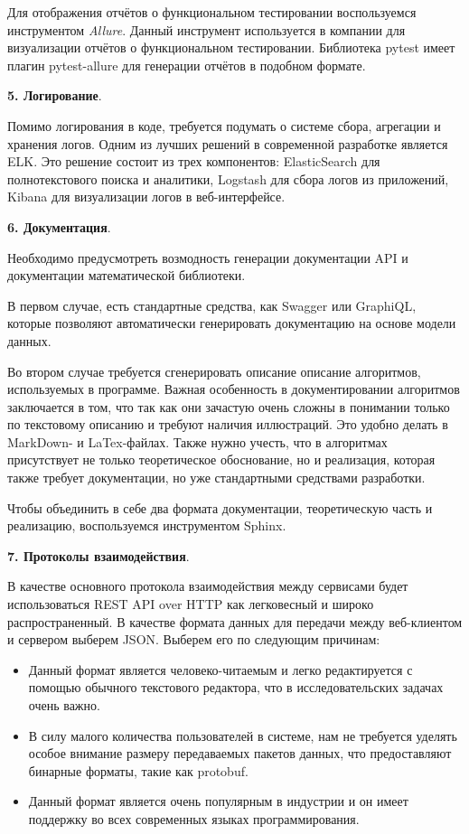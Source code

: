 Для отображения отчётов о функциональном тестировании воспользуемся инструментом \textit{Allure}.
Данный инструмент используется в компании для визуализации отчётов о функциональном тестировании.
Библиотека pytest имеет плагин pytest-allure для генерации отчётов в подобном формате.

\noindent \textbf{5. Логирование}.

Помимо логирования в коде, требуется подумать о системе сбора, агрегации и хранения логов.
Одним из лучших решений в современной разработке является ELK.
Это решение состоит из трех компонентов: ElasticSearch для полнотекстового поиска и аналитики,
Logstash для сбора логов из приложений, Kibana для визуализации логов в веб-интерфейсе.

\noindent \textbf{6. Документация}.

Необходимо предусмотреть возмодность генерации документации API и документации математической библиотеки.

В первом случае, есть стандартные средства, как Swagger или GraphiQL,
которые позволяют автоматически генерировать документацию на основе модели данных.

Во втором случае требуется сгенерировать описание описание алгоритмов, используемых в программе.
Важная особенность в документировании алгоритмов заключается в том, что так как они зачастую очень сложны
в понимании только по текстовому описанию и требуют наличия иллюстраций. Это удобно делать в MarkDown- и LaTex-файлах.
Также нужно учесть, что в алгоритмах присутствует не только теоретическое обоснование, но и реализация, которая также
требует документации, но уже стандартными средствами разработки.

Чтобы объединить в себе два формата документации, теоретическую часть и реализацию,
воспользуемся инструментом Sphinx\cite{Sphinx}.

\noindent \textbf{7. Протоколы взаимодействия}.

В качестве основного протокола взаимодействия между сервисами будет использоваться
REST API over HTTP как легковесный и широко распространенный.
В качестве формата данных для передачи между веб-клиентом и сервером выберем JSON. Выберем его по следующим причинам:
\begin{itemize}
    \item Данный формат является человеко-читаемым и легко редактируется с помощью обычного текстового редактора,
    что в исследовательских задачах очень важно.
    \item В силу малого количества пользователей в системе, нам не требуется уделять особое внимание размеру
    передаваемых пакетов данных, что предоставляют бинарные форматы, такие как protobuf\cite{Protobuf}.
    \item Данный формат является очень популярным в индустрии и он имеет поддержку
    во всех современных языках программирования.
\end{itemize}


